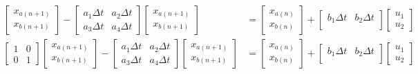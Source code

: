 \documentclass[11pt]{article}
\begin{document}
\begin{subequations}
\begin{align}
    \begin{bmatrix}
      x_{a(n+1)} \\
      x_{b(n+1)}
    \end{bmatrix} -
    \begin{bmatrix}
      a_1\Delta t & a_2\Delta t \\
      a_3\Delta t & a_4\Delta t
    \end{bmatrix}
    \begin{bmatrix}
      x_{a(n+1)} \\
      x_{b(n+1)}
    \end{bmatrix} &=
    \begin{bmatrix}
      x_{a(n)} \\
      x_{b(n)}
    \end{bmatrix} +
    \begin{bmatrix}
      b_1\Delta t & b_2\Delta t \\
    \end{bmatrix}
    \begin{bmatrix}
      u_1 \\
      u_2
    \end{bmatrix} \\
    \begin{bmatrix}
      1 & 0 \\
      0 & 1
    \end{bmatrix}
    \begin{bmatrix}
      x_{a(n+1)} \\
      x_{b(n+1)}
    \end{bmatrix} -
    \begin{bmatrix}
      a_1\Delta t & a_2\Delta t \\
      a_3\Delta t & a_4\Delta t
    \end{bmatrix}
    \begin{bmatrix}
      x_{a(n+1)} \\
      x_{b(n+1)}
    \end{bmatrix} &=
    \begin{bmatrix}
      x_{a(n)} \\
      x_{b(n)}
    \end{bmatrix} +
    \begin{bmatrix}
      b_1\Delta t & b_2\Delta t \\
    \end{bmatrix}
    \begin{bmatrix}
      u_1 \\
      u_2
    \end{bmatrix} \\

\end{align}
\end{subequations}
\end{document}
